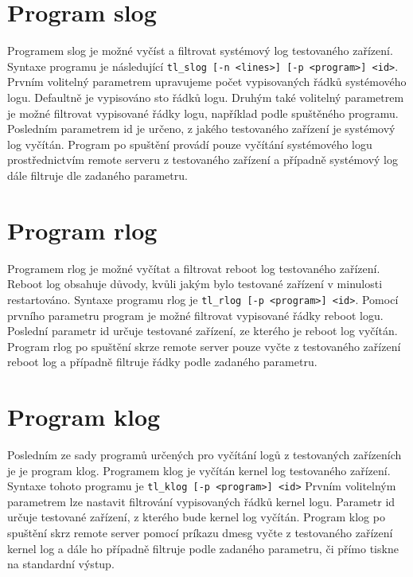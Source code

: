 \section{Program slog}
Programem slog je možné vyčíst a filtrovat systémový log testovaného zařízení. Syntaxe programu je následující \texttt{tl\_slog [-n <lines>] [-p <program>] <id>}. Prvním volitelný parametrem upravujeme počet vypisovaných řádků systémového logu. Defaultně je vypisováno sto řádků logu. Druhým také volitelný parametrem je možné filtrovat vypisované řádky logu, například podle spuštěného programu. Posledním parametrem id je určeno, z jakého testovaného zařízení je systémový log vyčítán. Program po spuštění provádí pouze vyčítání systémového logu prostřednictvím remote serveru z testovaného zařízení a případně systémový log dále filtruje dle zadaného parametru.

\section{Program rlog}
Programem rlog je možné vyčítat a filtrovat reboot log testovaného zařízení. Reboot log obsahuje důvody, kvůli jakým bylo testované zařízení v minulosti restartováno. Syntaxe programu rlog je \texttt{tl\_rlog [-p <program>] <id>}. Pomocí prvního parametru program je možné filtrovat vypisované řádky reboot logu. Poslední parametr id určuje testované zařízení, ze kterého je reboot log vyčítán. Program rlog po spuštění skrze remote server pouze vyčte z testovaného zařízení reboot log a případně filtruje řádky podle zadaného parametru.

\section{Program klog}
Posledním ze sady programů určených pro vyčítání logů z testovaných zařízeních je je program klog. Programem klog je vyčítán kernel log testovaného zařízení. Syntaxe tohoto programu je \texttt{tl\_klog [-p <program>] <id>} Prvním volitelným parametrem lze nastavit filtrování vypisovaných řádků kernel logu. Parametr id určuje testované zařízení, z kterého bude kernel log vyčítán. Program klog po spuštění skrz remote server pomocí príkazu dmesg vyčte z testovaného zařízení kernel log a dále ho případně filtruje podle zadaného parametru, či přímo tiskne na standardní výstup.

